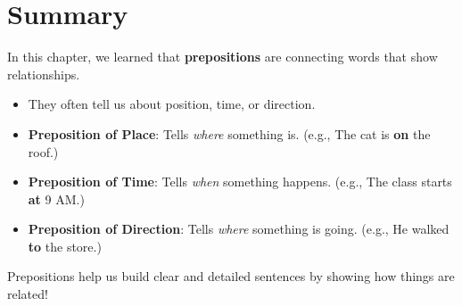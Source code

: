 \section{Summary}
\begin{summarybox}
In this chapter, we learned that \textbf{prepositions} are connecting words that show relationships.
\begin{itemize}
    \item They often tell us about position, time, or direction.
    \item \textbf{Preposition of Place}: Tells \textit{where} something is. (e.g., The cat is \textbf{on} the roof.)
    \item \textbf{Preposition of Time}: Tells \textit{when} something happens. (e.g., The class starts \textbf{at} 9 AM.)
    \item \textbf{Preposition of Direction}: Tells \textit{where} something is going. (e.g., He walked \textbf{to} the store.)
\end{itemize}
Prepositions help us build clear and detailed sentences by showing how things are related!
\end{summarybox}